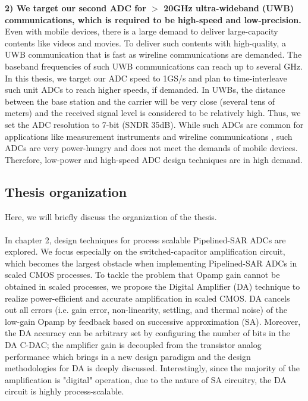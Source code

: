 \textbf{2) We target our second ADC for $>$ 20GHz ultra-wideband (UWB) communications, which is required to be high-speed and low-precision.}
Even with mobile devices, there is a large demand to deliver large-capacity contents like videos and movies. To deliver such contents with high-quality, a UWB communication that is fast as wireline communications are demanded. 
The baseband frequencies of such UWB communications can reach up to several GHz. In this thesis, we target our ADC speed to 1GS/s and plan to time-interleave such unit ADCs to reach higher speeds, if demanded.
In UWBs, the distance between the base station and the carrier will be very close (several tens of meters) and the received signal level is considered to be relatively high. Thus, we set the ADC resolution to 7-bit (SNDR 35dB).
While such ADCs are common for applications like measurement instruments and wireline communications  \cite{kullveryfastsar}, such ADCs are very power-hungry and does not meet the demands of mobile devices. Therefore, low-power and high-speed ADC design techniques are in high demand.

\subsection{Thesis organization}
Here, we will briefly discuss the organization of the thesis.
\\
\\
In chapter 2, design techniques for process scalable Pipelined-SAR ADCs are explored.
We focus especially on the switched-capacitor amplification circuit, which becomes the largest obstacle when implementing Pipelined-SAR ADCs in scaled CMOS processes.
To tackle the problem that Opamp gain cannot be obtained in scaled processes, we propose the Digital Amplifier (DA) technique to realize power-efficient and accurate amplification in scaled CMOS. 
DA cancels out all errors (i.e. gain error, non-linearity, settling, and thermal noise) of the low-gain Opamp by feedback based on successive approximation (SA).
Moreover, the DA accuracy can be arbitrary set by configuring the number of bits in the DA C-DAC; the amplifier gain is decoupled from the transistor analog performance which brings in a new design paradigm and the design methodologies for DA is deeply discussed. Interestingly, since the majority of the amplification is "digital" operation, due to the nature of SA circuitry, the DA circuit is highly process-scalable.


